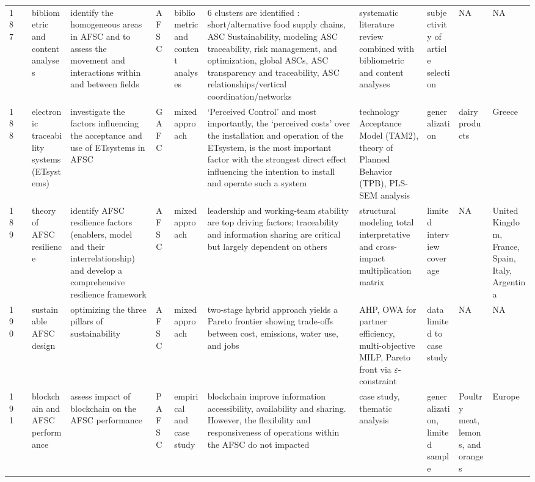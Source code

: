 \documentclass[a4paper,10pt]{article}
\begin{document}
\begin{landscape}
\begin{small}
\begin{longtable}{p{0.5cm} p{2cm} p{2.5cm} p{4cm} p{1cm} p{2.5cm} p{5.5cm} p{2.5cm} p{2.5cm} p{1.8cm} p{1.5cm}}
187 & \textcite{Luo188} &bibliometric and content analyses & identify the homogeneous areas in AFSC and to assess the movement and interactions within and between fields &AFSC & bibliometric and content analyses& 6 clusters are identified : short/alternative food supply chains, ASC Sustainability, modeling ASC traceability, risk management, and optimization, global ASCs, ASC transparency and traceability, ASC relationships/vertical coordination/networks& systematic literature review combined with bibliometric and content analyses & subjectivity of article selection& NA& NA  \\
188 & \textcite{Pappa189} &electronic traceability systems (ETsystems) &investigate the factors influencing the acceptance and use of ETsystems in AFSC&GAFC & mixed approach&‘Perceived Control’ and most importantly, the ‘perceived costs’ over the installation and operation of the ETsystem, is the most important factor with the strongest direct effect influencing the intention to install and operate such a system & technology Acceptance Model  (TAM2), theory of Planned Behavior (TPB), PLS-SEM analysis & generalization & dairy products & Greece  \\
189 & \textcite{Zhao190} &theory of AFSC resilience & identify AFSC resilience factors (enablers, model and their interrelationship) and develop a comprehensive resilience framework &AFSC& mixed approach&  leadership and working-team stability are top driving factors; traceability and information sharing are critical but largely dependent on others  &structural modeling total interpretative and cross-impact multiplication matrix   & limited interview coverage & NA& United Kingdom, France, Spain, Italy, Argentina  \\
190 & \textcite{Allaoui191} &sustainable AFSC design& optimizing the three pillars of sustainability&AFSC & mixed approach& two-stage hybrid approach yields a Pareto frontier showing trade-offs between cost, emissions, water use, and jobs & AHP, OWA for partner efficiency, multi-objective MILP, Pareto front via $\varepsilon$-constraint  &  data limited to case study& NA& NA  \\
191 & \textcite{Stefanella192} &blockchain and AFSC performance &  assess impact of blockchain on the AFSC performance& PAFSC & empirical and case study& blockchain improve information accessibility, availability and sharing. However, the flexibility and responsiveness of operations within the AFSC do not impacted &case study, thematic analysis   & generalization, limited sample& Poultry meat, lemons, and oranges & Europe  \\

\end{longtable}
\end{small}
\end{landscape}
\end{document}
